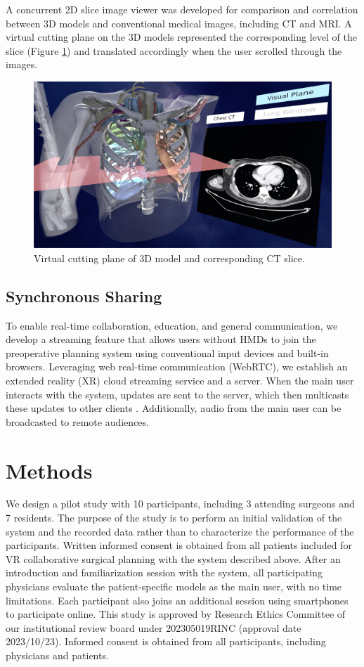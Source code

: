 \documentclass[sn-mathphys-num]{sn-jnl}%
\theoremstyle{thmstyleone}%
\theoremstyle{thmstyletwo}%
\theoremstyle{thmstylethree}%
\begin{document}
A concurrent 2D slice image viewer was developed for comparison and correlation between 3D models and conventional medical images, including CT and MRI. A virtual cutting plane on the 3D models represented the corresponding level of the slice (Figure \ref{fig:CuttingPlane}) and translated accordingly when the user scrolled through the images.
\begin{figure}
  \centering
  \includegraphics[width=.9\linewidth]{../Media/CuttingPlane.png}  
  \caption{Virtual cutting plane of 3D model and corresponding CT slice.}
  \label{fig:CuttingPlane}
\end{figure}
\subsection{Synchronous Sharing}
To enable real-time collaboration, education, and general communication, we develop a streaming feature that allows users without HMDs to join the preoperative planning system using conventional input devices and built-in browsers. Leveraging web real-time communication (WebRTC), we establish an extended reality (XR) cloud streaming service and a server. When the main user interacts with the system, updates are sent to the server, which then multicasts these updates to other clients \cite{RN12}. Additionally, audio from the main user can be broadcasted to remote audiences.
\section{Methods}
We design a pilot study with 10 participants, including 3 attending surgeons and 7 residents. The purpose of the study is to perform an initial validation of the system and the recorded data rather than to characterize the performance of the participants. Written informed consent is obtained from all patients included for VR collaborative surgical planning with the system described above. After an introduction and familiarization session with the system, all participating physicians evaluate the patient-specific models as the main user, with no time limitations. Each participant also joins an additional session using smartphones to participate online. This study is approved by Research Ethics Committee of our institutional review board under 202305019RINC (approval date 2023/10/23). Informed consent is obtained from all participants, including physicians and patients.
\end{document}
